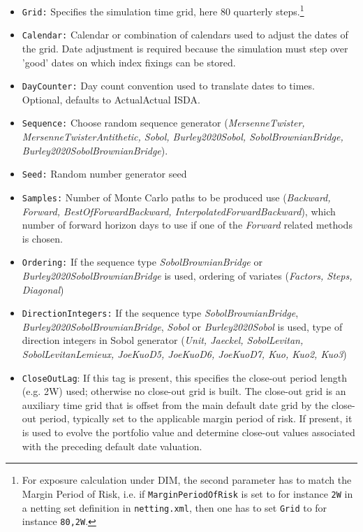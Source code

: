 \documentclass[12pt, a4paper]{article}
\begin{document}
{\begin{itemize}
\item {\tt Grid:} Specifies the simulation time grid, here 80 quarterly steps.\footnote{For exposure calculation under DIM, the second parameter has to match the Margin Period of Risk, i.e. if {\tt MarginPeriodOfRisk} is set to for instance {\tt 2W} in a netting set definition in {\tt netting.xml}, then one has to set {\tt Grid} to for instance {\tt 80,2W}.}
\item {\tt Calendar:} Calendar or combination of calendars used to adjust the dates of the grid. Date adjustment is
required because the simulation must step over 'good' dates on which index fixings can be stored.
\item {\tt DayCounter:} Day count convention used to translate dates to times. Optional, defaults to ActualActual ISDA.
\item {\tt Sequence:} Choose random sequence generator ({\em MersenneTwister, MersenneTwisterAntithetic, Sobol,
  Burley2020Sobol, SobolBrownianBridge, Burley2020SobolBrownianBridge}).
\item {\tt Seed:} Random number generator seed
\item {\tt Samples:} Number of Monte Carlo paths to be produced
use ({\em Backward, Forward, BestOfForwardBackward, InterpolatedForwardBackward}), which number of forward horizon days
to use if one of the {\em Forward } related methods is chosen.
\item {\tt Ordering:} If the sequence type {\em SobolBrownianBridge} or {\em Burley2020SobolBrownianBridge} is used,
  ordering of variates ({\em Factors, Steps, Diagonal})
\item {\tt DirectionIntegers:} If the sequence type {\em SobolBrownianBridge}, {\em Burley2020SobolBrownianBridge}, {\em
  Sobol} or {\em Burley2020Sobol} is used, type of direction integers in Sobol generator ({\em Unit, Jaeckel,
  SobolLevitan, SobolLevitanLemieux, JoeKuoD5, JoeKuoD6, JoeKuoD7, Kuo, Kuo2, Kuo3})
\item {\tt CloseOutLag}: If this tag is present, this specifies the close-out period length (e.g. 2W) used; otherwise no close-out grid is built. The close-out grid is an auxiliary time grid that is offset from the main default date grid by the close-out period, typically set to the applicable margin period of risk. If present, it is used to evolve the portfolio value and determine close-out values associated with the preceding default date valuation.

\end{itemize}}
\end{document}
